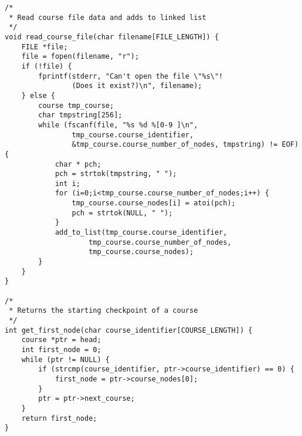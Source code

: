 \documentclass[pdftex,12pt,a4paper]{article}
\begin{document}
\begin{verbatim}
/*
 * Read course file data and adds to linked list
 */
void read_course_file(char filename[FILE_LENGTH]) {
    FILE *file;
    file = fopen(filename, "r");
    if (!file) {
        fprintf(stderr, "Can't open the file \"%s\"!
        		(Does it exist?)\n", filename);
    } else {
        course tmp_course;
        char tmpstring[256];
        while (fscanf(file, "%s %d %[0-9 ]\n",
        		tmp_course.course_identifier,
        		&tmp_course.course_number_of_nodes, tmpstring) != EOF) {
            char * pch;
            pch = strtok(tmpstring, " ");
            int i;
            for (i=0;i<tmp_course.course_number_of_nodes;i++) {
                tmp_course.course_nodes[i] = atoi(pch);
                pch = strtok(NULL, " ");
            }
            add_to_list(tmp_course.course_identifier,
            		tmp_course.course_number_of_nodes,
            		tmp_course.course_nodes);
        }
    }
}

/*
 * Returns the starting checkpoint of a course
 */
int get_first_node(char course_identifier[COURSE_LENGTH]) {
    course *ptr = head;
    int first_node = 0;
    while (ptr != NULL) {
        if (strcmp(course_identifier, ptr->course_identifier) == 0) {
            first_node = ptr->course_nodes[0];
        }
        ptr = ptr->next_course;
    }
    return first_node;
}
\end{verbatim}
\end{document}
